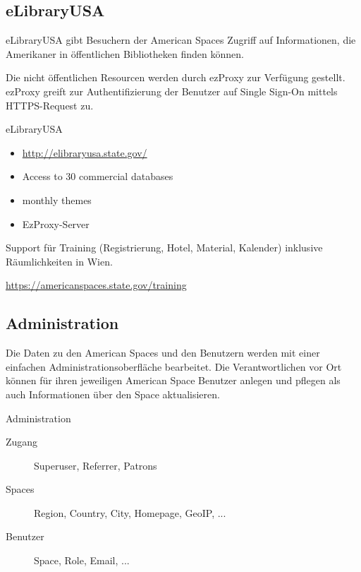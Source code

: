 \subsection{eLibraryUSA}

eLibraryUSA gibt Besuchern der American Spaces Zugriff
auf Informationen, die Amerikaner in öffentlichen
Bibliotheken finden können.
    
Die nicht öffentlichen Resourcen werden durch ezProxy zur
Verfügung gestellt. ezProxy greift zur Authentifizierung
der Benutzer auf Single Sign-On mittels HTTPS-Request zu.

\begin{frame}{eLibraryUSA}
\begin{itemize}
\item \url{http://elibraryusa.state.gov/}
\item Access to 30 commercial databases
\item monthly themes
\item EzProxy-Server
\end{itemize}
\end{frame}


Support für Training (Registrierung, Hotel, Material, Kalender)
inklusive Räumlichkeiten in Wien.

\url{https://americanspaces.state.gov/training}
    
\subsection{Administration}

Die Daten zu den American Spaces und den Benutzern werden
mit einer einfachen Administrationsoberfläche bearbeitet.
Die Verantwortlichen vor Ort können für ihren
jeweiligen American Space Benutzer anlegen und pflegen
als auch Informationen über den Space aktualisieren.

\begin{frame}{Administration}
\begin{description}
\item[Zugang] Superuser, Referrer, Patrons
\item[Spaces] Region, Country, City, Homepage, GeoIP, ...
\item[Benutzer] Space, Role, Email, ...
\end{description}
\end{frame}

